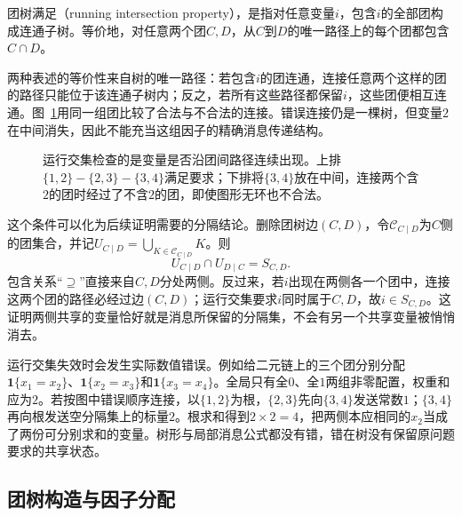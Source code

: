 \begin{definition}[运行交集性质]
  \label{def:pgm-junction-tree-running-intersection}
  团树满足（running intersection property），是指对任意变量$i$，包含$i$的全部团构成连通子树。等价地，对任意两个团$C,D$，从$C$到$D$的唯一路径上的每个团都包含$C\cap D$。
\end{definition}

两种表述的等价性来自树的唯一路径：若包含$i$的团连通，连接任意两个这样的团的路径只能位于该连通子树内；反之，若所有这些路径都保留$i$，这些团便相互连通。图~\ref{fig:pgm-junction-tree-running-intersection}用同一组团比较了合法与不合法的连接。错误连接仍是一棵树，但变量$2$在中间消失，因此不能充当这组因子的精确消息传递结构。

\begin{figure}[htbp]
  \centering
  
  \caption{运行交集检查的是变量是否沿团间路径连续出现。上排$\{1,2\}-\{2,3\}-\{3,4\}$满足要求；下排将$\{3,4\}$放在中间，连接两个含$2$的团时经过了不含$2$的团，即使图形无环也不合法。}
  \label{fig:pgm-junction-tree-running-intersection}
\end{figure}

这个条件可以化为后续证明需要的分隔结论。删除团树边$(C,D)$，令$\mathcal{C}_{C\mid D}$为$C$侧的团集合，并记$U_{C\mid D}=\bigcup_{K\in\mathcal{C}_{C\mid D}}K$。则
\begin{equation}
  U_{C\mid D}\cap U_{D\mid C}=S_{C,D}.
  \label{eq:pgm-junction-tree-cut-intersection}
\end{equation}
包含关系“$\supseteq$”直接来自$C,D$分处两侧。反过来，若$i$出现在两侧各一个团中，连接这两个团的路径必经过边$(C,D)$；运行交集要求$i$同时属于$C,D$，故$i\in S_{C,D}$。这证明两侧共享的变量恰好就是消息所保留的分隔集，不会有另一个共享变量被悄悄消去。

运行交集失效时会发生实际数值错误。例如给二元链上的三个团分别分配$\mathbf{1}\{x_1=x_2\}$、$\mathbf{1}\{x_2=x_3\}$和$\mathbf{1}\{x_3=x_4\}$。全局只有全$0$、全$1$两组非零配置，权重和应为$2$。若按图中错误顺序连接，以$\{1,2\}$为根，$\{2,3\}$先向$\{3,4\}$发送常数$1$；$\{3,4\}$再向根发送空分隔集上的标量$2$。根求和得到$2\times2=4$，把两侧本应相同的$x_2$当成了两份可分别求和的变量。树形与局部消息公式都没有错，错在树没有保留原问题要求的共享状态。

\subsection{团树构造与因子分配}
\label{sec:pgm-junction-tree-spanning-tree}

